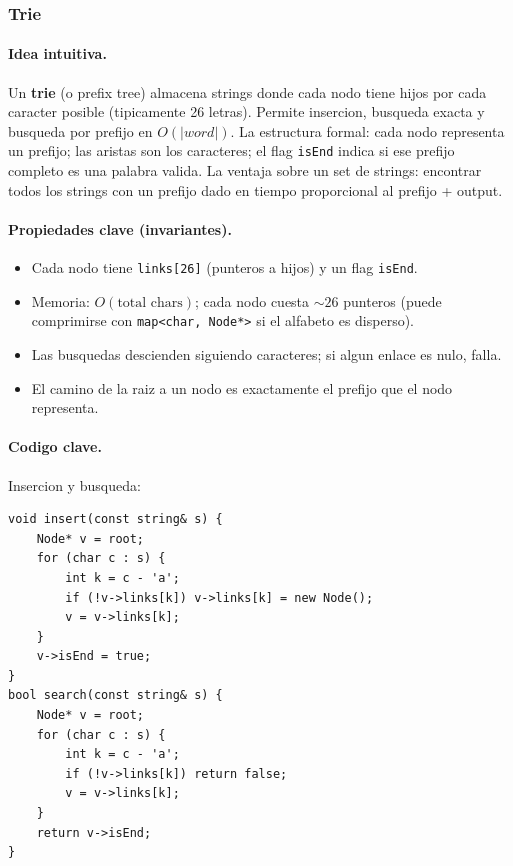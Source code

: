 ﻿\subsubsection{Trie}

\paragraph{Idea intuitiva.}
Un \textbf{trie} (o prefix tree) almacena strings donde cada nodo tiene hijos por cada caracter posible (tipicamente 26 letras). Permite insercion, busqueda exacta y busqueda por prefijo en $O(|word|)$. La estructura formal: cada nodo representa un prefijo; las aristas son los caracteres; el flag \texttt{isEnd} indica si ese prefijo completo es una palabra valida. La ventaja sobre un set de strings: encontrar todos los strings con un prefijo dado en tiempo proporcional al prefijo + output.

\paragraph{Propiedades clave (invariantes).}
\begin{itemize}\setlength\itemsep{0pt}
	\item Cada nodo tiene \texttt{links[26]} (punteros a hijos) y un flag \texttt{isEnd}.
	\item Memoria: $O(\text{total chars})$; cada nodo cuesta $\sim 26$ punteros (puede comprimirse con \texttt{map<char, Node*>} si el alfabeto es disperso).
	\item Las busquedas descienden siguiendo caracteres; si algun enlace es nulo, falla.
	\item El camino de la raiz a un nodo es exactamente el prefijo que el nodo representa.
\end{itemize}

\paragraph{Codigo clave.}
Insercion y busqueda:
\begin{verbatim}
void insert(const string& s) {
    Node* v = root;
    for (char c : s) {
        int k = c - 'a';
        if (!v->links[k]) v->links[k] = new Node();
        v = v->links[k];
    }
    v->isEnd = true;
}
bool search(const string& s) {
    Node* v = root;
    for (char c : s) {
        int k = c - 'a';
        if (!v->links[k]) return false;
        v = v->links[k];
    }
    return v->isEnd;
}
\end{verbatim}

